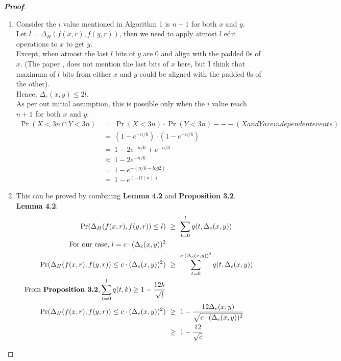 \documentclass{article}
\begin{document}
\begin{proof}[\textbf{Proof}]
\begin{enumerate}
        \item Consider the $i$ value mentioned in Algorithm 1 is $n+1$ for both
        $x$ and $y$.\\
        Let $l = \Delta_H(f(x,r),f(y,r))$, then we need to apply atmost $l$ edit
        operations to $x$ to get $y$. \\
        Except, when atmost the last $l$ bits of $y$ are 0 and align with the 
        padded 0s of $x$. (The paper \cite{CGK16}, does not mention the last 
        bits of $x$ here, but I think that maximum of $l$ bits from either $x$ and
        $y$ could be aligned with the padded 0s of the other).\\
        Hence, $\Delta_e(x,y) \leq 2l$.\\
        As per out initial assumption, this is possible only when the $i$ value
        reach $n+1$ for both $x$ and $y$.\\
        \begin{align}
            \Pr(X<3n \cap Y<3n) &~=~ \Pr(X<3n) \cdot \Pr(Y<3n) ---(X and Y are independent events) \nonumber \\
            &~=~ (1-e^{-n/6})\cdot(1-e^{-n/6}) \nonumber\\
            &~=~ 1-2e^{-n/6}+e^{-n/3} \nonumber\\
            &~\approx~ 1-2e^{-n/6} \nonumber \\
            &~=~ 1-e^{-(n/6-log2)} \nonumber \\
            &~=~ 1-e^{(-\Omega(n))} \nonumber
        \end{align}
        \item This can be proved by combining \textbf{Lemma 4.2} and 
        \textbf{Proposition 3.2}.\\
        \textbf{Lemma 4.2}: 
        \begin{align}
            \Pr(\Delta_H(f(x,r),f(y,r))\leq l) &~\geq~ 
            \sum_{t=0}^{l} q(t,\Delta_e(x,y))\nonumber\\
            \text{For our case, $l=c\cdot (\Delta_e(x,y))^2$} \nonumber\\
            \Pr(\Delta_H(f(x,r),f(y,r))\leq c\cdot (\Delta_e(x,y))^2) &~\geq~ 
            \sum_{t=0}^{c\cdot (\Delta_e(x,y))^2} q(t,\Delta_e(x,y)) \nonumber\\
            \text{From \textbf{Proposition 3.2},} 
            \sum_{t=0}^{l} q(t,k) \geq 1- \frac{12k}{\sqrt{l}} \nonumber \\
            \Pr(\Delta_H(f(x,r),f(y,r))\leq c\cdot (\Delta_e(x,y))^2) &~\geq~ 
            1-\frac{12\Delta_e(x,y)}{\sqrt{c\cdot (\Delta_e(x,y))^2}}  \nonumber \\
            &~\geq~ 1-\frac{12}{\sqrt{c}} \nonumber
        \end{align}
    \end{enumerate}
\end{proof}
\end{document}
